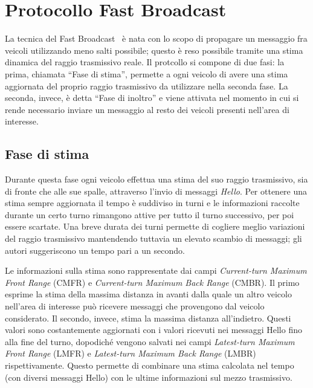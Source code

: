 
\chapter{Protocollo Fast Broadcast}\label{chap:protocollo-fast-broadcast}
La tecnica del Fast Broadcast~\cite{Palazzi07howdo} è nata con lo scopo di propagare un messaggio
fra veicoli utilizzando meno salti possibile; questo è reso possibile tramite una stima dinamica del raggio trasmissivo reale.
Il protcollo si compone di due fasi: la prima, chiamata ``Fase di stima'', permette a ogni veicolo di avere una stima aggiornata
del proprio raggio trasmissivo da utilizzare nella seconda fase.
La seconda, invece, è detta ``Fase di inoltro'' e viene attivata nel momento in cui si rende necessario inviare un messaggio
al resto dei veicoli presenti nell'area di interesse.
%
\section{Fase di stima}\label{sec:fb-fase-di-stima}
Durante questa fase ogni veicolo effettua una stima del suo raggio trasmissivo, sia di fronte che alle sue spalle, attraverso l'invio di messaggi \textit{Hello}.
Per ottenere una stima sempre aggiornata il tempo è suddiviso in turni e le informazioni raccolte durante un certo turno
rimangono attive per tutto il turno successivo, per poi essere scartate.
Una breve durata dei turni permette di cogliere meglio variazioni del raggio trasmissivo mantendendo tuttavia un elevato scambio di messaggi;
gli autori suggeriscono un tempo pari a un secondo.

Le informazioni sulla stima sono rappresentate dai campi \textit{Current-turn Maximum Front Range} (CMFR) e \textit{Current-turn Maximum Back Range} (CMBR).
Il primo esprime la stima della massima distanza in avanti dalla quale un altro veicolo nell'area di interesse può ricevere messaggi che provengono dal veicolo considerato.
Il secondo, invece, stima la massima distanza all'indietro.
Questi valori sono costantemente aggiornati con i valori ricevuti nei messaggi Hello fino alla fine del turno,
dopodiché vengono salvati nei campi \textit{Latest-turn Maximum Front Range} (LMFR) e \textit{Latest-turn Maximum Back Range} (LMBR) rispettivamente.
Questo permette di combinare una stima calcolata nel tempo (con diversi messaggi Hello) con le ultime informazioni sul mezzo trasmissivo.

